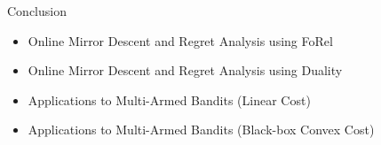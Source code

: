 \begin{frame}{Conclusion}
    \begin{itemize}
        \item Online Mirror Descent and Regret Analysis using FoRel\pause
        \item Online Mirror Descent and Regret Analysis using Duality\pause
        \item Applications to Multi-Armed Bandits (Linear Cost)\pause
        \item Applications to Multi-Armed Bandits (Black-box Convex Cost)
    \end{itemize}
\end{frame}


